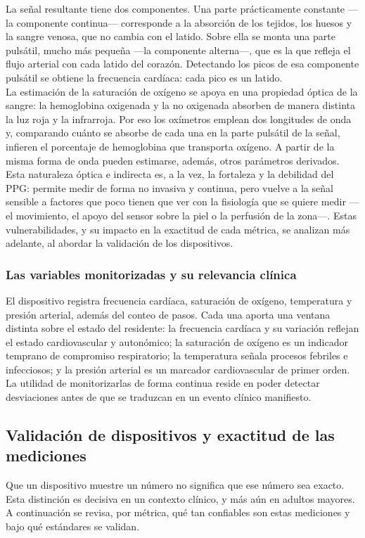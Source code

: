 La señal resultante tiene dos componentes. Una parte prácticamente constante —la componente continua— corresponde a la absorción de los tejidos, los huesos y la sangre venosa, que no cambia con el latido. Sobre ella se monta una parte pulsátil, mucho más pequeña —la componente alterna—, que es la que refleja el flujo arterial con cada latido del corazón. Detectando los picos de esa componente pulsátil se obtiene la frecuencia cardíaca: cada pico es un latido.\\

La estimación de la saturación de oxígeno se apoya en una propiedad óptica de la sangre: la hemoglobina oxigenada y la no oxigenada absorben de manera distinta la luz roja y la infrarroja. Por eso los oxímetros emplean dos longitudes de onda y, comparando cuánto se absorbe de cada una en la parte pulsátil de la señal, infieren el porcentaje de hemoglobina que transporta oxígeno. A partir de la misma forma de onda pueden estimarse, además, otros parámetros derivados.\\

Esta naturaleza óptica e indirecta es, a la vez, la fortaleza y la debilidad del PPG: permite medir de forma no invasiva y continua, pero vuelve a la señal sensible a factores que poco tienen que ver con la fisiología que se quiere medir —el movimiento, el apoyo del sensor sobre la piel o la perfusión de la zona—. Estas vulnerabilidades, y su impacto en la exactitud de cada métrica, se analizan más adelante, al abordar la validación de los dispositivos.\\


\subsubsection{Las variables monitorizadas y su relevancia clínica}
El dispositivo registra frecuencia cardíaca, saturación de oxígeno, temperatura y presión arterial, además del conteo de pasos. Cada una aporta una ventana distinta sobre el estado del residente: la frecuencia cardíaca y su variación reflejan el estado cardiovascular y autonómico; la saturación de oxígeno es un indicador temprano de compromiso respiratorio; la temperatura señala procesos febriles e infecciosos; y la presión arterial es un marcador cardiovascular de primer orden. La utilidad de monitorizarlas de forma continua reside en poder detectar desviaciones antes de que se traduzcan en un evento clínico manifiesto.\\


\subsection{Validación de dispositivos y exactitud de las mediciones}
Que un dispositivo muestre un número no significa que ese número sea exacto. Esta distinción es decisiva en un contexto clínico, y más aún en adultos mayores. A continuación se revisa, por métrica, qué tan confiables son estas mediciones y bajo qué estándares se validan.\\


